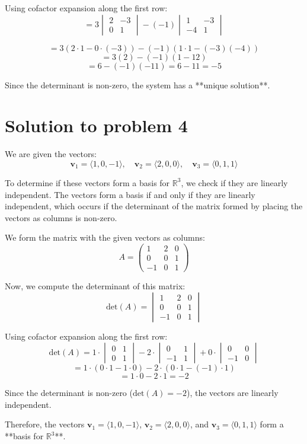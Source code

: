 \documentclass[11pt]{article}
\begin{document}
Using cofactor expansion along the first row:
\[
= 3 \begin{vmatrix} 2 & -3 \\ 0 & 1 \end{vmatrix} - (-1) \begin{vmatrix} 1 & -3 \\ -4 & 1 \end{vmatrix}
\]

\[
= 3(2 \cdot 1 - 0 \cdot (-3)) - (-1)\left(1 \cdot 1 - (-3)(-4)\right)
\]
\[
= 3(2) - (-1)(1 - 12)
\]
\[
= 6 - (-1)(-11) = 6 - 11 = -5
\]

Since the determinant is non-zero, the system has a **unique solution**.




\newpage

\section{Solution to problem 4}

We are given the vectors:
\[
\mathbf{v}_1 = \langle 1, 0, -1 \rangle, \quad \mathbf{v}_2 = \langle 2, 0, 0 \rangle, \quad \mathbf{v}_3 = \langle 0, 1, 1 \rangle
\]

To determine if these vectors form a basis for \( \mathbb{R}^3 \), we check if they are linearly independent. The vectors form a basis if and only if they are linearly independent, which occurs if the determinant of the matrix formed by placing the vectors as columns is non-zero.

We form the matrix with the given vectors as columns:
\[
A = \begin{pmatrix}
1 & 2 & 0 \\
0 & 0 & 1 \\
-1 & 0 & 1
\end{pmatrix}
\]

Now, we compute the determinant of this matrix:
\[
\text{det}(A) = \begin{vmatrix}
1 & 2 & 0 \\
0 & 0 & 1 \\
-1 & 0 & 1
\end{vmatrix}
\]

Using cofactor expansion along the first row:
\[
\text{det}(A) = 1 \cdot \begin{vmatrix} 0 & 1 \\ 0 & 1 \end{vmatrix} - 2 \cdot \begin{vmatrix} 0 & 1 \\ -1 & 1 \end{vmatrix} + 0 \cdot \begin{vmatrix} 0 & 0 \\ -1 & 0 \end{vmatrix}
\]
\[
= 1 \cdot (0 \cdot 1 - 1 \cdot 0) - 2 \cdot (0 \cdot 1 - (-1) \cdot 1)
\]
\[
= 1 \cdot 0 - 2 \cdot 1 = -2
\]

Since the determinant is non-zero (\( \text{det}(A) = -2 \)), the vectors are linearly independent.

Therefore, the vectors \( \mathbf{v}_1 = \langle 1, 0, -1 \rangle \), \( \mathbf{v}_2 = \langle 2, 0, 0 \rangle \), and \( \mathbf{v}_3 = \langle 0, 1, 1 \rangle \) form a **basis for \( \mathbb{R}^3 \)**.
\end{document}
